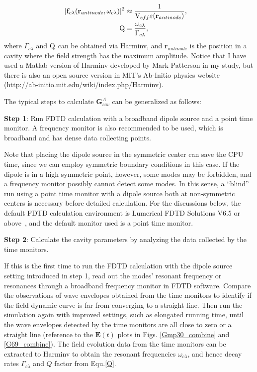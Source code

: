 \begin{align}
|\mathbf{f}_{c\lambda}(\mathbf{r}_{antinode},\omega_{c\lambda})|^2 &{} \approx  \frac{1}{{\rm V}_{eff}\varepsilon(\mathbf{r}_{antinode})},\label{EVeff}\quad \\
{\rm Q} &= \frac{\omega_{c\lambda}}{\Gamma_{c\lambda}}\label{Q},
\end{align}
where $\Gamma_{c\lambda}$ and ${\rm Q}$ can be obtained via Harminv,
and $\mathbf{r}_{antinode}$ is the position in a cavity where the field strength has the maximum amplitude. Notice that I have used a Matlab version of Harminv developed by Mark Patterson in my study, but there is also an open source version in MIT's Ab-Initio physics website (http://ab-initio.mit.edu/wiki/index.php/Harminv).

The typical steps to calculate $\mathbf{G}^{A}_{cav}$ can be generalized as follows:

\textbf{Step 1}: Run FDTD calculation with a broadband dipole source
and a point time monitor. A frequency monitor is also recommended to be used, which is broadband and has dense data collecting points.

Note that placing the dipole source in the symmetric center can save the CPU time, since we can employ symmetric boundary conditions in this case.
If the dipole is in a high symmetric point, however, some modes may be forbidden, and a frequency monitor possibly cannot detect some modes.
In this sense, a ``blind'' run using a point time monitor with a dipole source both at non-symmetric centers is necessary before detailed calculation.
For the discussions below, the default FDTD calculation environment is Lumerical FDTD Solutions V6.5 or above~\cite{LumericalSolutions}, and the default monitor used is a point time monitor.

\textbf{Step 2}: Calculate the cavity parameters by analyzing the data collected by the time monitors.

If this is the first time to run the FDTD calculation with the dipole source setting introduced in step 1,
read out the modes' resonant frequency or resonances through a broadband frequency monitor in FDTD software.
Compare the observations of wave envelopes obtained from the time monitors to identify if the field dynamic curve is far from converging to a straight line. Then run the simulation again with improved settings, such as elongated running time, until the wave envelopes detected by the time monitors are all close to zero or a straight line (reference to the $\mathbf{E}(t)$ plots in Figs. \ref{Gmp30_combine} and \ref{G69_combine}). The field evolution data from the time monitors can be extracted to Harminv to obtain the resonant frequencies $\omega_{c\lambda}$, and hence decay rates $\Gamma_{c\lambda}$ and $Q$ factor from Equ.\eqref{Q}.

